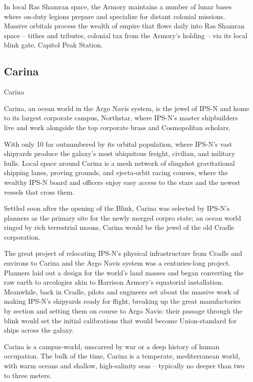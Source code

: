 In local Ras Shamran space, the Armory maintains a number of lunar bases where on-duty  
legions prepare and specialize for distant colonial missions. Massive orbitals process the wealth  
of empire that flows daily into Ras Shamran space -- tithes and tributes, colonial tax from the  
Armory’s holding -- via its local blink gate, Capitol Peak Station.    
\subsection{Carina}
Carina   

Carina, an ocean world in the Argo Navis system, is the jewel of IPS-N and home to its largest  
corporate campus, Northstar, where IPS-N’s master shipbuilders live and work alongside the top  
corporate brass and Cosmopolitan scholars.   

With only 10%
far outnumbered by its orbital population, where IPS-N’s vast shipyards produce the galaxy’s most  
ubiquitous freight, civilian, and military hulls. Local space around Carina is a mesh network of  
slingshot gravitational shipping lanes, proving grounds, and ejecta-orbit racing courses, where the  
wealthy IPS-N board and officers enjoy easy access to the stars and the newest vessels that  
cross them.    

Settled soon after the opening of the Blink, Carina was selected by IPS-N’s planners as the  
primary site for the newly merged corpro state; an ocean world ringed by rich terrestrial moons,  
Carina would be the jewel of the old Cradle corporation.   

The great project of relocating IPS-N’s physical infrastructure from Cradle and environs to Carina  
and the Argo Navis system was a centuries-long project. Planners laid out a design for the world’s  
land masses and began converting the raw earth to arcologies akin to Harrison Armory’s  
equatorial installation. Meanwhile, back in Cradle, pilots and engineers set about the massive  
work of making IPS-N’s shipyards ready for flight, breaking up the great manufactories by section  
and setting them on course to Argo Navis: their passage through the blink would set the initial  
calibrations that would become Union-standard for ships across the galaxy.   

                                                                                                           


Carina is a campus-world, unscarred by war or a deep history of human occupation. The bulk of  
the time, Carina is a temperate, mediterranean world, with warm oceans and shallow, high-salinity  
seas -- typically no deeper than two to three meters.   


